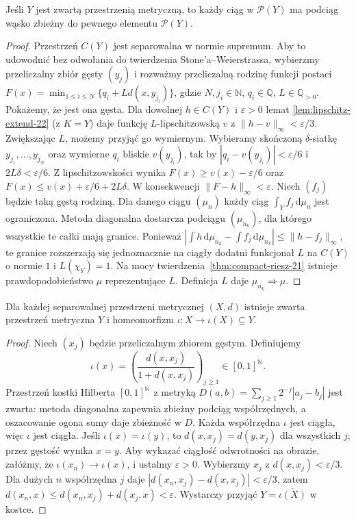 \begin{lemat}
\label{lem:compact-prob-22}
Jeśli $Y$ jest zwartą przestrzenią metryczną,
to każdy ciąg w $\mathcal P(Y)$ ma podciąg wąsko
zbieżny do pewnego elementu $\mathcal P(Y)$.
\end{lemat}
\begin{proof}
Przestrzeń $C(Y)$ jest separowalna w normie supremum.
Aby to udowodnić bez odwołania do twierdzenia
Stone'a--Weierstrassa, wybierzmy przeliczalny zbiór
gęsty $(y_j)$ i rozważmy przeliczalną rodzinę
funkcji postaci
$F(x)=\min_{1\le i\le N}\{q_i+L d(x,y_{j_i})\}$,
gdzie $N,j_i\in\mathbb N$, $q_i\in\mathbb Q$,
$L\in\mathbb Q_{>0}$.
Pokażemy, że jest ona gęsta. Dla dowolnej
$h\in C(Y)$ i $\varepsilon>0$ lemat
\ref{lem:lipschitz-extend-22} (z $K=Y$) daje
funkcję $L$-lipschitzowską $v$ z
$\|h-v\|_\infty<\varepsilon/3$.
Zwiększając $L$, możemy przyjąć go wymiernym.
Wybieramy skończoną $\delta$-siatkę
$y_{j_1},\ldots,y_{j_N}$ oraz wymierne $q_i$
bliskie $v(y_{j_i})$, tak by
$|q_i-v(y_{j_i})|<\varepsilon/6$ i
$2L\delta<\varepsilon/6$.
Z lipschitzowskości wynika
$F(x)\ge v(x)-\varepsilon/6$ oraz
$F(x)\le v(x)+\varepsilon/6+2L\delta$.
W konsekwencji $\|F-h\|_\infty<\varepsilon$.
Niech $(f_j)$ będzie taką gęstą
rodziną. Dla danego ciągu $(\mu_n)$ każdy ciąg
$\int_Y f_j\,\mathrm d\mu_n$ jest ograniczona.
Metoda diagonalna dostarcza podciągu $(\mu_{n_k})$,
dla którego wszystkie te całki mają granice.
Ponieważ
$|\int h\,\mathrm d\mu_{n_k}-\int f_j\,\mathrm d\mu_{n_k}|
\le\|h-f_j\|_\infty$, te granice rozszerzają się
jednoznacznie na ciągły dodatni funkcjonał $L$ na
$C(Y)$ o normie $1$ i $L(\chi_Y)=1$.
Na mocy twierdzenia~\ref{thm:compact-riesz-21}
istnieje prawdopodobieństwo $\mu$ reprezentujące $L$.
Definicja $L$ daje $\mu_{n_k}\Rightarrow\mu$.
\end{proof}

\begin{lemat}
\label{lem:hilbert-cube-22}
Dla każdej separowalnej przestrzeni metrycznej $(X,d)$
istnieje zwarta przestrzeń metryczna $Y$ i homeomorfizm
$\iota:X\to\iota(X)\subseteq Y$.
\end{lemat}
\begin{proof}
Niech $(x_j)$ będzie przeliczalnym zbiorem gęstym.
Definiujemy
\[
\iota(x)=\left(\frac{d(x,x_j)}{1+d(x,x_j)}\right)_{j\ge1}
\in[0,1]^{\mathbb N}.
\]
Przestrzeń kostki Hilberta $[0,1]^{\mathbb N}$ z metryką
$D(a,b)=\sum_{j\ge1}2^{-j}|a_j-b_j|$ jest zwarta:
metoda diagonalna zapewnia zbieżny podciąg współrzędnych,
a oszacowanie ogona sumy daje zbieżność w $D$.
Każda współrzędna $\iota$ jest ciągła, więc
$\iota$ jest ciągła. Jeśli $\iota(x)=\iota(y)$,
to $d(x,x_j)=d(y,x_j)$ dla wszystkich $j$;
przez gęstość wynika $x=y$.
Aby wykazać ciągłość odwrotności na obrazie, załóżmy,
że $\iota(x_n)\to\iota(x)$, i ustalmy $\varepsilon>0$.
Wybierzmy $x_j$ z $d(x,x_j)<\varepsilon/3$.
Dla dużych $n$ współrzędna $j$ daje
$|d(x_n,x_j)-d(x,x_j)|<\varepsilon/3$,
zatem $d(x_n,x)\le d(x_n,x_j)+d(x_j,x)<\varepsilon$.
Wystarczy przyjąć $Y=\overline{\iota(X)}$ w kostce.
\end{proof}


